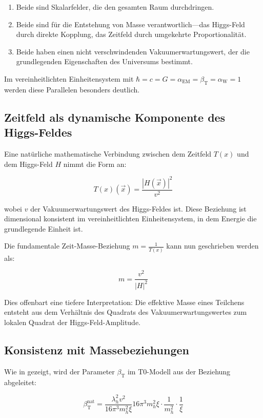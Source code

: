 \documentclass[12pt,a4paper]{article}
\newcommand{\Tfield}{T(x)}
\newcommand{\betaT}{\beta_{\text{T}}}
\newcommand{\alphaEM}{\alpha_{\text{EM}}}
\newcommand{\alphaW}{\alpha_{\text{W}}}
\newcommand{\vecx}{\vec{x}}
\begin{document}
	\begin{enumerate}
		\item Beide sind Skalarfelder, die den gesamten Raum durchdringen.
		\item Beide sind für die Entstehung von Masse verantwortlich—das Higgs-Feld durch direkte Kopplung, das Zeitfeld durch umgekehrte Proportionalität.
		\item Beide haben einen nicht verschwindenden Vakuumerwartungswert, der die grundlegenden Eigenschaften des Universums bestimmt.
	\end{enumerate}
	
	Im vereinheitlichten Einheitensystem mit \(\hbar = c = G = \alphaEM = \betaT = \alphaW = 1\) werden diese Parallelen besonders deutlich.
	
	\subsection{Zeitfeld als dynamische Komponente des Higgs-Feldes}
	Eine natürliche mathematische Verbindung zwischen dem Zeitfeld \(\Tfield\) und dem Higgs-Feld \(H\) nimmt die Form an:
	
	\begin{equation}
		\Tfield(\vecx) = \frac{|H(\vecx)|^2}{v^2}
	\end{equation}
	
	wobei \(v\) der Vakuumerwartungswert des Higgs-Feldes ist. Diese Beziehung ist dimensional konsistent im vereinheitlichten Einheitensystem, in dem Energie die grundlegende Einheit ist.
	
	Die fundamentale Zeit-Masse-Beziehung \(m = \frac{1}{\Tfield}\) kann nun geschrieben werden als:
	
	\begin{equation}
		m = \frac{v^2}{|H|^2}
	\end{equation}
	
	Dies offenbart eine tiefere Interpretation: Die effektive Masse eines Teilchens entsteht aus dem Verhältnis des Quadrats des Vakuumerwartungswertes zum lokalen Quadrat der Higgs-Feld-Amplitude.
	
	\subsection{Konsistenz mit Massebeziehungen}
	Wie in \cite{pascher_params_2025} gezeigt, wird der Parameter \(\betaT\) im T0-Modell aus der Beziehung abgeleitet:
	
	\begin{equation}
		\betaT^{\text{nat}} = \frac{\lambda_h^2 v^2}{16\pi^3 m_h^2 \xi}{16\pi^3 m_h^2 \xi} \cdot \frac{1}{m_h^2} \cdot \frac{1}{\xi}
	\end{equation}
	
\end{document}
